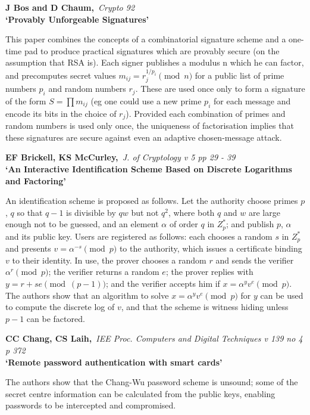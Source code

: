 {\bf \noindent J Bos and D Chaum,}{\em ~Crypto 92\\}
{\bf `Provably Unforgeable Signatures'}

This paper combines the concepts of a combinatorial signature scheme and a 
one-time pad to produce practical signatures which are provably secure (on the
assumption that RSA is). Each signer publishes a modulus n which he can factor,
and precomputes secret values $m_{ij} = r_j^{1/p_i} \pmod{n}$ for a public
list of prime numbers $p_i$ and random numbers $r_j$. These are used once only 
to form a signature of the form $S = \prod m_{ij}$ (eg one could use a new 
prime $p_i$ for each message and encode its bits in the choice of $r_j$).
Provided each combination of primes and random numbers is used only once, 
the uniqueness of factorisation implies that these signatures are secure 
against even an adaptive chosen-message attack.

\pagebreak

{\bf \noindent EF Brickell, KS McCurley,}{\em ~J. of Cryptology v 5 pp 
29 - 39\\}
{\bf `An Interactive Identification Scheme Based on Discrete Logarithms 
and Factoring'}

An identification scheme is proposed as follows. Let the authority choose
primes $p$, $q$ so that $q-1$ is divisible by $qw$ but not $q^2$, where both 
$q$ and $w$ are large enough not to be guessed, and an element $\alpha$ of
order $q$ in $Z_p^*$; and publish $p$, $\alpha$ and its public key. Users
are registered as follows: each chooses a random $s$ in $Z_p^*$ and presents
$v = \alpha^{-s} \pmod{p}$ to the authority, which issues a certificate 
binding $v$ to their identity. In use, the prover chooses a random $r$ and 
sends the verifier $\alpha^r \pmod{p}$; the verifier returns a random $e$; the
prover replies with $y = r+se \pmod{(p-1)}$; and the verifier accepts him if
$x = \alpha^yv^e \pmod{p}$. The authors show that an algorithm to solve 
$x = \alpha^yv^e \pmod{p}$ for $y$ can be used to compute the discrete log of
$v$, and that the scheme is witness hiding unless $p-1$ can be factored.

{\bf \noindent CC Chang, CS Laih,}{\em ~IEE Proc. Computers and Digital
Techniques v 139 no 4 p 372\\}
{\bf `Remote password authentication with smart cards'}

The authors show that the Chang-Wu password scheme is unsound; some of the
secret centre information can be calculated from the public keys, enabling
passwords to be intercepted and compromised.

